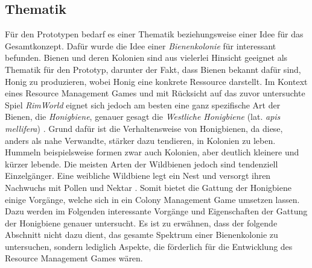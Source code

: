 \subsection{Thematik}
Für den Prototypen bedarf es einer Thematik beziehungsweise einer Idee für das Gesamtkonzept. Dafür wurde die Idee einer \textit{Bienenkolonie} für interessant befunden. Bienen und deren Kolonien sind aus vielerlei Hinsicht geeignet als Thematik für den Prototyp, darunter der Fakt, dass Bienen bekannt dafür sind, Honig zu produzieren, wobei Honig eine konkrete Ressource darstellt. Im Kontext eines Resource Management Games und mit Rücksicht auf das zuvor untersuchte Spiel \textit{RimWorld} eignet sich jedoch am besten eine ganz spezifische Art der Bienen, die \textit{Honigbiene}, genauer gesagt die \textit{Westliche Honigbiene} (lat. \textit{apis mellifera}) \cite*[]{bees:name}. Grund dafür ist die Verhaltensweise von Honigbienen, da diese, anders als nahe Verwandte, stärker dazu tendieren, in Kolonien zu leben. Hummeln beispielsweise formen zwar auch Kolonien, aber deutlich kleinere und kürzer lebende. Die meisten Arten der Wildbienen jedoch sind tendenziell Einzelgänger. Eine weibliche Wildbiene legt ein Nest und versorgt ihren Nachwuchs mit Pollen und Nektar \cite*[]{bees:wild}. Somit bietet die Gattung der Honigbiene einige Vorgänge, welche sich in ein Colony Management Game umsetzen lassen. Dazu werden im Folgenden interessante Vorgänge und Eigenschaften der Gattung der Honigbiene genauer untersucht. Es ist zu erwähnen, dass der folgende Abschnitt nicht dazu dient, das gesamte Spektrum einer Bienenkolonie zu untersuchen, sondern lediglich Aspekte, die förderlich für die Entwicklung des Resource Management Games wären.

